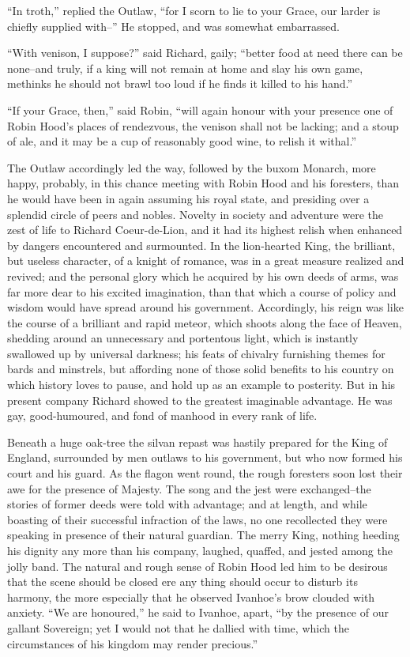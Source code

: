 ``In troth,'' replied the Outlaw, ``for I scorn to lie to your Grace,
our larder is chiefly supplied with--'' He stopped, and was somewhat
embarrassed.

``With venison, I suppose?'' said Richard, gaily; ``better food at need
there can be none--and truly, if a king will not remain at home and slay
his own game, methinks he should not brawl too loud if he finds it
killed to his hand.''

``If your Grace, then,'' said Robin, ``will again honour with your
presence one of Robin Hood's places of rendezvous, the venison shall not
be lacking; and a stoup of ale, and it may be a cup of reasonably good
wine, to relish it withal.''

The Outlaw accordingly led the way, followed by the buxom Monarch, more
happy, probably, in this chance meeting with Robin Hood and his
foresters, than he would have been in again assuming his royal state,
and presiding over a splendid circle of peers and nobles. Novelty in
society and adventure were the zest of life to Richard Coeur-de-Lion,
and it had its highest relish when enhanced by dangers encountered and
surmounted. In the lion-hearted King, the brilliant, but useless
character, of a knight of romance, was in a great measure realized and
revived; and the personal glory which he acquired by his own deeds of
arms, was far more dear to his excited imagination, than that which a
course of policy and wisdom would have spread around his government.
Accordingly, his reign was like the course of a brilliant and rapid
meteor, which shoots along the face of Heaven, shedding around an
unnecessary and portentous light, which is instantly swallowed up by
universal darkness; his feats of chivalry furnishing themes for bards
and minstrels, but affording none of those solid benefits to his country
on which history loves to pause, and hold up as an example to posterity.
But in his present company Richard showed to the greatest imaginable
advantage. He was gay, good-humoured, and fond of manhood in every rank
of life.

Beneath a huge oak-tree the silvan repast was hastily prepared for the
King of England, surrounded by men outlaws to his government, but who
now formed his court and his guard. As the flagon went round, the rough
foresters soon lost their awe for the presence of Majesty. The song and
the jest were exchanged--the stories of former deeds were told with
advantage; and at length, and while boasting of their successful
infraction of the laws, no one recollected they were speaking in
presence of their natural guardian. The merry King, nothing heeding his
dignity any more than his company, laughed, quaffed, and jested among
the jolly band. The natural and rough sense of Robin Hood led him to be
desirous that the scene should be closed ere any thing should occur to
disturb its harmony, the more especially that he observed Ivanhoe's brow
clouded with anxiety. ``We are honoured,'' he said to Ivanhoe, apart,
``by the presence of our gallant Sovereign; yet I would not that he
dallied with time, which the circumstances of his kingdom may render
precious.''


